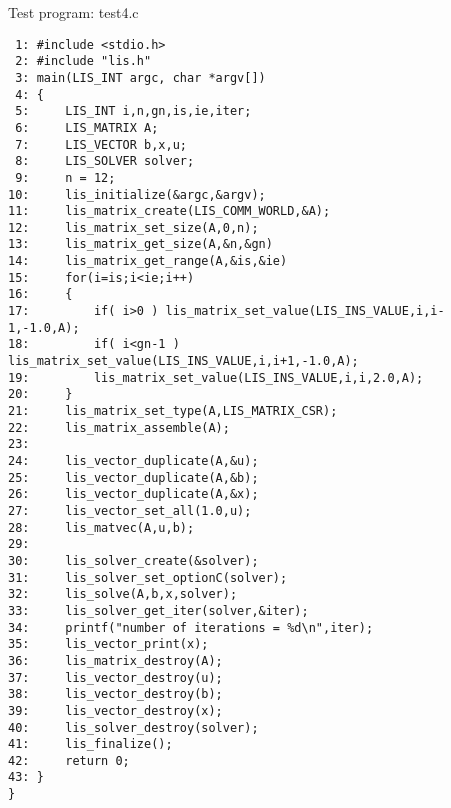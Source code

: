 \documentclass[a4paper]{article}
\begin{document}
\begin{itemsquarebox}[l]{Test program: test4.c}
{\small
\begin{verbatim}
 1: #include <stdio.h> 
 2: #include "lis.h" 
 3: main(LIS_INT argc, char *argv[]) 
 4: { 
 5:     LIS_INT i,n,gn,is,ie,iter; 
 6:     LIS_MATRIX A; 
 7:     LIS_VECTOR b,x,u; 
 8:     LIS_SOLVER solver; 
 9:     n = 12; 
10:     lis_initialize(&argc,&argv); 
11:     lis_matrix_create(LIS_COMM_WORLD,&A); 
12:     lis_matrix_set_size(A,0,n); 
13:     lis_matrix_get_size(A,&n,&gn) 
14:     lis_matrix_get_range(A,&is,&ie) 
15:     for(i=is;i<ie;i++) 
16:     { 
17:         if( i>0 ) lis_matrix_set_value(LIS_INS_VALUE,i,i-1,-1.0,A); 
18:         if( i<gn-1 ) lis_matrix_set_value(LIS_INS_VALUE,i,i+1,-1.0,A); 
19:         lis_matrix_set_value(LIS_INS_VALUE,i,i,2.0,A); 
20:     } 
21:     lis_matrix_set_type(A,LIS_MATRIX_CSR); 
22:     lis_matrix_assemble(A); 
23:  
24:     lis_vector_duplicate(A,&u); 
25:     lis_vector_duplicate(A,&b); 
26:     lis_vector_duplicate(A,&x); 
27:     lis_vector_set_all(1.0,u); 
28:     lis_matvec(A,u,b); 
29:  
30:     lis_solver_create(&solver); 
31:     lis_solver_set_optionC(solver); 
32:     lis_solve(A,b,x,solver); 
33:     lis_solver_get_iter(solver,&iter); 
34:     printf("number of iterations = %d\n",iter); 
35:     lis_vector_print(x); 
36:     lis_matrix_destroy(A); 
37:     lis_vector_destroy(u); 
38:     lis_vector_destroy(b); 
39:     lis_vector_destroy(x); 
40:     lis_solver_destroy(solver); 
41:     lis_finalize(); 
42:     return 0; 
43: } 
}
\end{verbatim}
}
\end{itemsquarebox}
\end{document}
